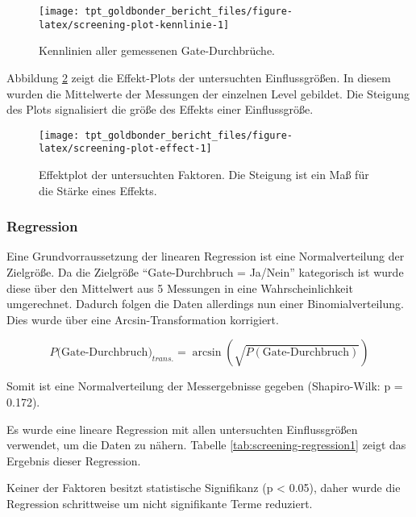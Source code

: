 \documentclass[
  paper=a4,
  ,captions=tableheading
]{scrartcl}
\begin{document}
\begin{figure}

{\centering \texttt{[image: tpt\_goldbonder\_bericht\_files/figure-latex/screening-plot-kennlinie-1]} 

}

\caption{Kennlinien aller gemessenen Gate-Durchbrüche.}\label{fig:screening-plot-kennlinie}
\end{figure}

Abbildung \ref{fig:screening-plot-effect} zeigt die Effekt-Plots der untersuchten Einflussgrößen. In diesem wurden die Mittelwerte der Messungen der einzelnen Level gebildet. Die Steigung des Plots signalisiert die größe des Effekts einer Einflussgröße.

\begin{figure}

{\centering \texttt{[image: tpt\_goldbonder\_bericht\_files/figure-latex/screening-plot-effect-1]} 

}

\caption{Effektplot der untersuchten Faktoren. Die Steigung ist ein Maß für die Stärke eines Effekts.}\label{fig:screening-plot-effect}
\end{figure}

\hypertarget{regression}{%
\subsubsection{Regression}\label{regression}}

Eine Grundvorraussetzung der linearen Regression ist eine Normalverteilung der Zielgröße. Da die Zielgröße \enquote{Gate-Durchbruch = Ja/Nein} kategorisch ist wurde diese über den Mittelwert aus 5 Messungen in eine Wahrscheinlichkeit umgerechnet. Dadurch folgen die Daten allerdings nun einer Binomialverteilung. Dies wurde über eine Arcsin-Transformation korrigiert.

\[ P(\text{Gate-Durchbruch)}_{trans.} = \arcsin\left(\sqrt{P(\text{Gate-Durchbruch})}\right)\]

Somit ist eine Normalverteilung der Messergebnisse gegeben (Shapiro-Wilk: p = 0.172).

Es wurde eine lineare Regression mit allen untersuchten Einflussgrößen verwendet, um die Daten zu nähern. Tabelle \ref{tab:screening-regression1} zeigt das Ergebnis dieser Regression.

Keiner der Faktoren besitzt statistische Signifikanz (p \textless{} 0.05), daher wurde die Regression schrittweise um nicht signifikante Terme reduziert.
\end{document}
